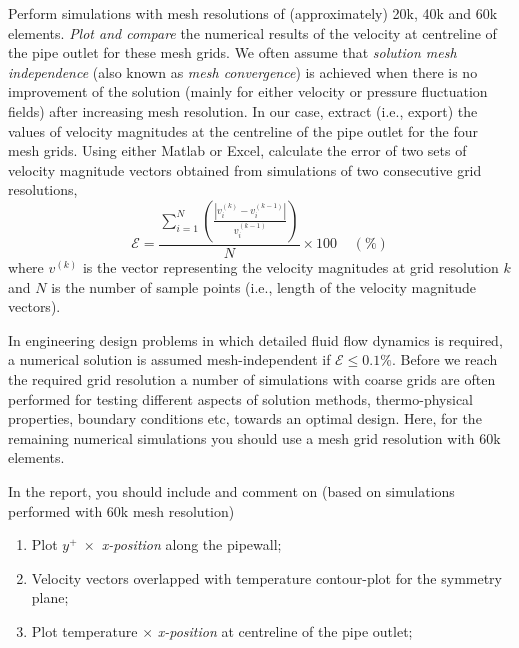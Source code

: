 \documentclass[12pts,a4paper,amsmath,amssymb,floatfix]{article}%
\renewcommand\le{\leqslant}
\begin{document}
     
    \begin{shaded}
    Perform simulations with mesh resolutions of (approximately) 20k, 40k and 60k elements. \emph{Plot and compare} the numerical results of the velocity at centreline of the pipe outlet for these mesh grids. We often assume that \emph{solution mesh independence} (also known as \emph{mesh convergence}) is achieved when there is no improvement of the solution (mainly for either velocity or pressure fluctuation fields)  after increasing mesh resolution. In our case, extract (i.e., export)  the values of velocity magnitudes at the centreline of the pipe outlet for the four mesh grids. Using either Matlab or Excel, calculate the error of two sets of velocity magnitude vectors obtained from simulations of two consecutive grid resolutions, 
        \begin{displaymath}
           \mathcal{E} = \frac{\sum\limits_{i=1}^{N}\left(\frac{\left|v_{i}^{(k)}-v_{i}^{(k-1)}\right|}{v_{i}^{(k-1)}}\right)}{N}\times 100\;\;\;\;\left(\%\right)
        \end{displaymath}
        where $v^{(k)}$ is the vector representing the velocity magnitudes at grid resolution $k$ and $N$ is the number of sample points (i.e., length of the velocity magnitude vectors). 
        \medskip
        
        In engineering design problems in which detailed fluid flow dynamics is required, a numerical solution is assumed mesh-independent if $\mathcal{E} \le 0.1\%$. Before we reach the required grid resolution a number of simulations with coarse grids are often performed for testing different aspects of solution methods, thermo-physical properties, boundary conditions etc, towards an optimal design. Here, for the remaining numerical simulations you should use a mesh grid resolution with 60k elements.
        \medskip
        
        In the report, you should include and comment on (based on simulations performed with 60k mesh resolution)
    \begin{enumerate}
        \item Plot $y^{+}\;\times$ {\it x-position} along the pipewall;
        \item Velocity vectors overlapped with temperature contour-plot for the symmetry plane;
        \item Plot temperature $\times$ {\it x-position} at centreline of the pipe outlet;
    \end{enumerate}
    \end{shaded}
    
\end{document}
